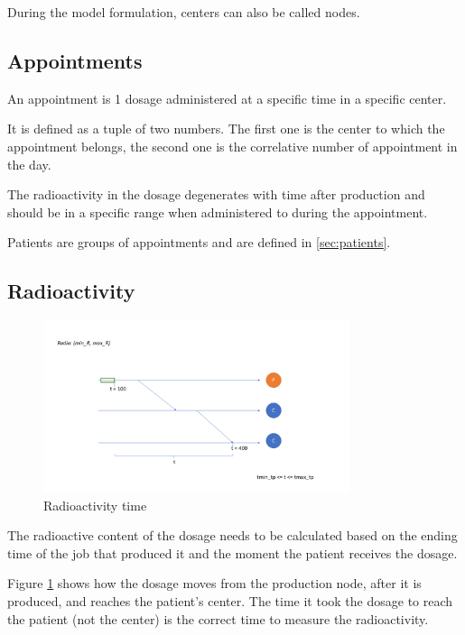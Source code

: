 During the model formulation, centers can also be called nodes.

\subsection{Appointments}

An appointment is 1 dosage administered at a specific time in a specific center.

It is defined as a tuple of two numbers. The first one is the center to which the appointment belongs, the second one is the correlative number of appointment in the day.

The radioactivity in the dosage degenerates with time after production and should be in a specific range when administered to during the appointment.

Patients are groups of appointments and are defined in \ref{sec:patients}.

\subsection{Radioactivity}

\begin{figure}
	\centering
	
		\includegraphics[width=0.80\textwidth]{imagenes/radioactivity.png}
	\caption{Radioactivity time}
	\label{fig:radioactivity}
\end{figure}


The radioactive content of the dosage needs to be calculated based on the ending time of the job that produced it and the moment the patient receives the dosage.

Figure \ref{fig:radioactivity} shows how the dosage moves from the production node, after it is produced, and reaches the patient's center. The time it took the dosage to reach the patient (not the center) is the correct time to measure the radioactivity.

